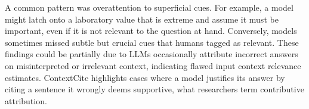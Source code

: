 \documentclass[fleqn,10pt]{wlscirep}
\begin{document}
A common pattern was overattention to superficial cues. For example, a model might latch onto a laboratory value that is extreme and assume it must be important, even if it is not relevant to the question at hand. %
Conversely, models sometimes missed subtle but crucial cues that humans tagged as relevant. %
These findings could be partially due to LLMs occasionally attribute incorrect answers on misinterpreted or irrelevant context, indicating flawed input context relevance estimates. ContextCite highlights cases where a model justifies its answer by citing a sentence it wrongly deems supportive, what researchers term contributive attribution. %

\end{document}
